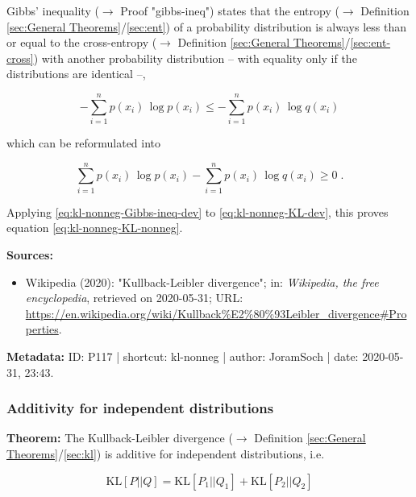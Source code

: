 \documentclass[a4paper,12pt,twoside]{book}
\begin{document}
Gibbs' inequality ($\rightarrow$ Proof "gibbs-ineq") states that the entropy ($\rightarrow$ Definition \ref{sec:General Theorems}/\ref{sec:ent}) of a probability distribution is always less than or equal to the cross-entropy ($\rightarrow$ Definition \ref{sec:General Theorems}/\ref{sec:ent-cross}) with another probability distribution – with equality only if the distributions are identical –,

\begin{equation} \label{eq:kl-nonneg-Gibbs-ineq}
- \sum_{i=1}^n p(x_i) \, \log p(x_i) \leq - \sum_{i=1}^n p(x_i) \, \log q(x_i)
\end{equation}

which can be reformulated into

\begin{equation} \label{eq:kl-nonneg-Gibbs-ineq-dev}
\sum_{i=1}^n p(x_i) \, \log p(x_i) - \sum_{i=1}^n p(x_i) \, \log q(x_i) \geq 0 \; .
\end{equation}

Applying \eqref{eq:kl-nonneg-Gibbs-ineq-dev} to \eqref{eq:kl-nonneg-KL-dev}, this proves equation \eqref{eq:kl-nonneg-KL-nonneg}.


\vspace{1em}
\textbf{Sources:}
\begin{itemize}
\item Wikipedia (2020): "Kullback-Leibler divergence"; in: \textit{Wikipedia, the free encyclopedia}, retrieved on 2020-05-31; URL: \url{https://en.wikipedia.org/wiki/Kullback%E2%80%93Leibler_divergence#Properties}.
\end{itemize}


\vspace{1em}
\textbf{Metadata:} ID: P117 | shortcut: kl-nonneg | author: JoramSoch | date: 2020-05-31, 23:43.
\vspace{1em}



\subsubsection[\textbf{Additivity for independent distributions}]{Additivity for independent distributions} \label{sec:kl-add}
\setcounter{equation}{0}

\textbf{Theorem:} The Kullback-Leibler divergence ($\rightarrow$ Definition \ref{sec:General Theorems}/\ref{sec:kl}) is additive for independent distributions, i.e.

\begin{equation} \label{eq:kl-add-KL-add}
\mathrm{KL}[P||Q] = \mathrm{KL}[P_1||Q_1] + \mathrm{KL}[P_2||Q_2]
\end{equation}
\end{document}
